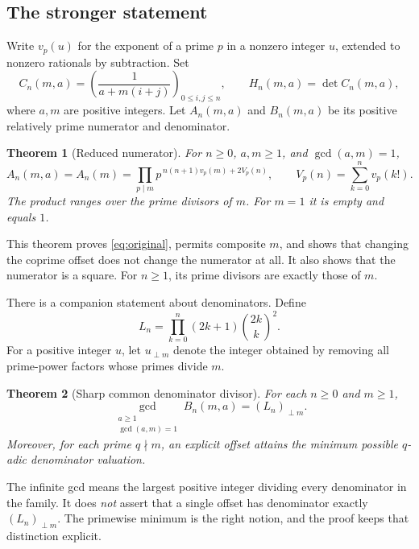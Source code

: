 \documentclass[11pt,a4paper]{article}
\numberwithin{equation}{section}
\newtheorem{theorem}{Theorem}[section]
\theoremstyle{definition}
\theoremstyle{remark}
\begin{document}
\subsection{The stronger statement}
Write $v_p(u)$ for the exponent of a prime $p$ in a nonzero integer $u$, extended to nonzero rationals by subtraction. Set
\begin{equation}\label{eq:defH}
 C_n(m,a)=\left(\frac1{a+m(i+j)}\right)_{0\leq i,j\leq n},
 \qquad H_n(m,a)=\det C_n(m,a),
\end{equation}
where $a,m$ are positive integers. Let $A_n(m,a)$ and $B_n(m,a)$ be its positive relatively prime numerator and denominator.

\begin{theorem}[Reduced numerator]\label{thm:numerator}
For $n\geq0$, $a,m\geq1$, and $\gcd(a,m)=1$,
\begin{equation}\label{eq:main}
 \boxed{\displaystyle
 A_n(m,a)=A_n(m)=
 \prod_{p\mid m}p^{\,n(n+1)v_p(m)+2V_p(n)},
 \qquad V_p(n)=\sum_{k=0}^n v_p(k!).}
\end{equation}
The product ranges over the prime divisors of $m$. For $m=1$ it is empty and equals $1$.
\end{theorem}

This theorem proves \eqref{eq:original}, permits composite $m$, and shows that changing the coprime offset does not change the numerator at all. It also shows that the numerator is a square. For $n\geq1$, its prime divisors are exactly those of $m$.

There is a companion statement about denominators. Define
\begin{equation}\label{eq:Ldef}
 L_n=\prod_{k=0}^n(2k+1)\binom{2k}{k}^{\!2}.
\end{equation}
For a positive integer $u$, let $u_{\perp m}$ denote the integer obtained by removing all prime-power factors whose primes divide $m$.

\begin{theorem}[Sharp common denominator divisor]\label{thm:gcd}
For each $n\geq0$ and $m\geq1$,
\begin{equation}\label{eq:gcd}
 \boxed{\displaystyle
 \gcd_{\substack{a\geq1\\\gcd(a,m)=1}} B_n(m,a)=(L_n)_{\perp m}.}
\end{equation}
Moreover, for each prime $q\nmid m$, an explicit offset attains the minimum possible $q$-adic denominator valuation.
\end{theorem}

The infinite gcd means the largest positive integer dividing every denominator in the family. It does \emph{not} assert that a single offset has denominator exactly $(L_n)_{\perp m}$. The primewise minimum is the right notion, and the proof keeps that distinction explicit.
\end{document}
